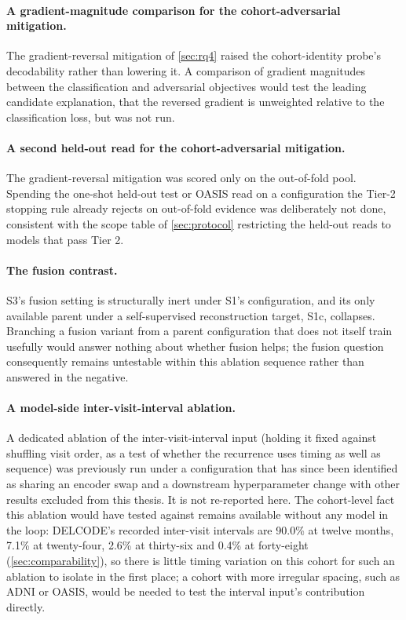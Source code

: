 \paragraph{A gradient-magnitude comparison for the cohort-adversarial mitigation.} The
gradient-reversal mitigation of \autoref{sec:rq4} raised the cohort-identity probe's
decodability rather than lowering it. A comparison of gradient magnitudes between the
classification and adversarial objectives would test the leading candidate explanation, that
the reversed gradient is unweighted relative to the classification loss, but was not run.

\paragraph{A second held-out read for the cohort-adversarial mitigation.} The
gradient-reversal mitigation was scored only on the out-of-fold pool. Spending the one-shot
held-out test or \ac{OASIS} read on a configuration the Tier-2 stopping rule already rejects on
out-of-fold evidence was deliberately not done, consistent with the scope table of
\autoref{sec:protocol} restricting the held-out reads to models that pass Tier 2.

\paragraph{The fusion contrast.} S3's fusion setting is structurally inert under S1's
configuration, and its only available parent under a self-supervised reconstruction target,
S1c, collapses. Branching a fusion variant from a parent configuration that does not itself
train usefully would answer nothing about whether fusion helps; the fusion question
consequently remains untestable within this ablation sequence rather than answered in the negative.

\paragraph{A model-side inter-visit-interval ablation.} A dedicated ablation of the
inter-visit-interval input (holding it fixed against shuffling visit order, as a test of
whether the recurrence uses timing as well as sequence) was previously run under a
configuration that has since been identified as sharing an encoder swap and a downstream
hyperparameter change with other results excluded from this thesis. It is not re-reported
here. The cohort-level fact this ablation would have tested against remains available
without any model in the loop: \ac{DELCODE}'s recorded inter-visit intervals are 90.0\% at
twelve months, 7.1\% at twenty-four, 2.6\% at thirty-six and 0.4\% at forty-eight
(\autoref{sec:comparability}), so there is little timing variation on this cohort for such
an ablation to isolate in the first place; a cohort with more irregular spacing, such as
\ac{ADNI} or \ac{OASIS}, would be needed to test the interval input's contribution directly.
